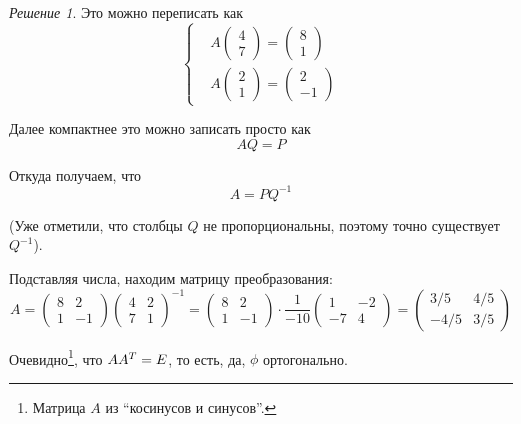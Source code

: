 \documentclass[a4paper,12pt]{article}
\theoremstyle{remark}
\newtheorem*{finalsolution}{Решение}
\begin{document}
\begin{finalsolution}
    Это можно переписать как
    \[
      \left\{
        \begin{aligned}
          &A \begin{pmatrix}4 \\ 7\end{pmatrix} = \begin{pmatrix}8 \\ 1\end{pmatrix}\\
          &A \begin{pmatrix}2 \\ 1\end{pmatrix} = \begin{pmatrix}2 \\ -1\end{pmatrix}
        \end{aligned}
      \right.
    \]
    
    Далее компактнее это можно записать просто как
    \[
      AQ = P
    \]
    
    Откуда получаем, что
    \[
      A = PQ^{-1}
    \]
    
    (Уже отметили, что столбцы $Q$ не пропорциональны, поэтому точно существует $Q^{-1}$).
    
    Подставляя числа, находим матрицу преобразования:
    \[
      A = \begin{pmatrix}
        8 & 2\\
        1 & -1
      \end{pmatrix} \begin{pmatrix}
        4 & 2\\
        7 & 1
      \end{pmatrix}^{-1}
      = \begin{pmatrix}
        8 & 2\\
        1 & -1
      \end{pmatrix} \cdot \frac{1}{-10} \begin{pmatrix}
        1 & -2\\
        -7 & 4
      \end{pmatrix}
      = \begin{pmatrix}
        3/5 & 4/5\\
        -4/5 & 3/5
      \end{pmatrix}
    \]
    
    Очевидно\footnote{Матрица $A$ из ``косинусов и синусов''.}, что $A A^T \hm= E$, то есть, да, $\phi$ ортогонально.
  \end{finalsolution}
\end{document}
